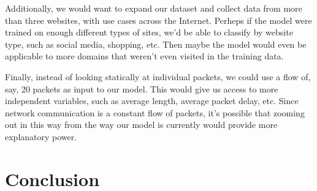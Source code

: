 \documentclass[10pt,sigconf,letterpaper,nonacm]{acmart}
\begin{document}
Additionally, we would want to expand our dataset and collect data from more than three websites, with use cases across the Internet. Perheps if the model were trained on enough different types of sites, we'd be able to classify by website type, such as social media, shopping, etc. Then maybe the model would even be applicable to more domains that weren't even visited in the training data.

Finally, instead of looking statically at individual packets, we could use a flow of, say, 20 packets as input to our model. This would give us access to more independent variables, such as average length, average packet delay, etc. Since network communication is a constant flow of packets, it's possible that zooming out in this way from the way our model is currently would provide more explanatory power.

\section{Conclusion}





\cite{10.1145/2388576.2388608}
\cite{10.5555/3432601.3432608}
\cite{10.1109/TNET.2014.2320577}
\cite{scikit-learn}
\cite{Wireshark}
\end{document}
